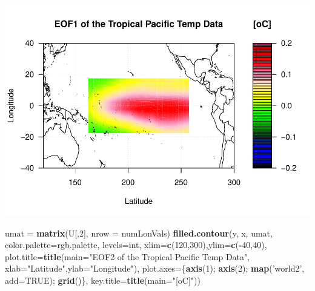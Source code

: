 \documentclass[
]{article}
\newenvironment{Shaded}{\begin{snugshade}}{\end{snugshade}}
\newcommand{\DataTypeTok}[1]{\textcolor[rgb]{0.13,0.29,0.53}{#1}}
\newcommand{\DecValTok}[1]{\textcolor[rgb]{0.00,0.00,0.81}{#1}}
\newcommand{\KeywordTok}[1]{\textcolor[rgb]{0.13,0.29,0.53}{\textbf{#1}}}
\newcommand{\NormalTok}[1]{#1}
\newcommand{\OperatorTok}[1]{\textcolor[rgb]{0.81,0.36,0.00}{\textbf{#1}}}
\newcommand{\OtherTok}[1]{\textcolor[rgb]{0.56,0.35,0.01}{#1}}
\newcommand{\StringTok}[1]{\textcolor[rgb]{0.31,0.60,0.02}{#1}}
\begin{document}
\includegraphics{Assignment3_files/figure-latex/unnamed-chunk-1-1.pdf}

\begin{Shaded}
\begin{Highlighting}[]
\NormalTok{umat =}\StringTok{ }\KeywordTok{matrix}\NormalTok{(U[,}\DecValTok{2}\NormalTok{], }\DataTypeTok{nrow =}\NormalTok{ numLonVals)}
\KeywordTok{filled.contour}\NormalTok{(y, x, umat, }\DataTypeTok{color.palette=}\NormalTok{rgb.palette, }\DataTypeTok{levels=}\NormalTok{int,}
               \DataTypeTok{xlim=}\KeywordTok{c}\NormalTok{(}\DecValTok{120}\NormalTok{,}\DecValTok{300}\NormalTok{),}\DataTypeTok{ylim=}\KeywordTok{c}\NormalTok{(}\OperatorTok{-}\DecValTok{40}\NormalTok{,}\DecValTok{40}\NormalTok{),}
               \DataTypeTok{plot.title=}\KeywordTok{title}\NormalTok{(}\DataTypeTok{main=}\StringTok{"EOF2 of the Tropical Pacific Temp Data"}\NormalTok{,}
                                \DataTypeTok{xlab=}\StringTok{"Latitude"}\NormalTok{,}\DataTypeTok{ylab=}\StringTok{"Longitude"}\NormalTok{),}
               \DataTypeTok{plot.axes=}\NormalTok{\{}\KeywordTok{axis}\NormalTok{(}\DecValTok{1}\NormalTok{); }\KeywordTok{axis}\NormalTok{(}\DecValTok{2}\NormalTok{); }\KeywordTok{map}\NormalTok{(}\StringTok{'world2'}\NormalTok{, }\DataTypeTok{add=}\OtherTok{TRUE}\NormalTok{); }\KeywordTok{grid}\NormalTok{()\},}
               \DataTypeTok{key.title=}\KeywordTok{title}\NormalTok{(}\DataTypeTok{main=}\StringTok{"[oC]"}\NormalTok{))}
\end{Highlighting}
\end{Shaded}
\end{document}
